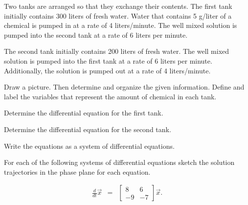   \begin{problem}

  \item Two tanks are arranged so that they exchange their
    contents. The first tank initially contains 300 liters of fresh
    water. Water that contains 5 g/liter of a chemical is pumped in at
    a rate of 4 liters/minute. The well mixed solution is pumped into
    the second tank at a rate of 6 liters per minute.

    The second tank initially contains 200 liters of fresh water. The
    well mixed solution is pumped into the first tank at a rate of 6
    liters per minute. Additionally, the solution is pumped out at a
    rate of 4 liters/minute.


    \begin{subproblem}
      \item Draw a picture. Then determine and organize the given
        information. Define and label the variables that represent the
        amount of chemical in each tank.
        \vfill

      \item Determine the differential equation for the first tank.
        \vfill

      \item Determine the differential equation for the second tank.
        \vfill

      \item Write the equations as a system of differential equations.
        \vfill

    \end{subproblem}

    \clearpage

  \item For each of the following systems of differential equations
    sketch the solution trajectories in the phase plane for each
    equation.
    
    \begin{subproblem}
      
    \item 
        \begin{eqnarray*}
          \frac{d}{dt} \vec{x} & = & 
          \left[ \begin{array}{rr}
               8 &  6 \\
              -9 & -7
            \end{array} \right] \vec{x}.
        \end{eqnarray*}


\end{subproblem}
\end{problem}
